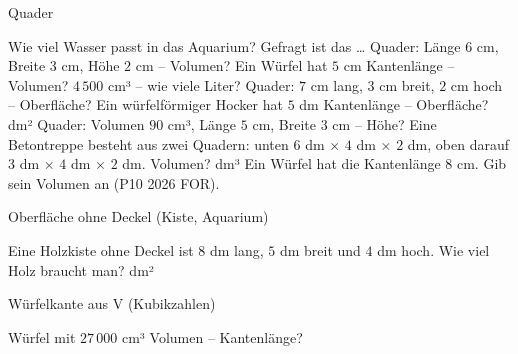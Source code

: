 \setcounter{aufgabe}{13}

\begin{aufgabe}{Quader}
\begin{teile}
\teil Wie viel Wasser passt in das Aquarium? Gefragt ist das …  
\teil Quader: Länge $6$ cm, Breite $3$ cm, Höhe $2$ cm – Volumen? \leerfeld[cm³]
\teil Ein Würfel hat $5$ cm Kantenlänge – Volumen? \leerfeld[cm³]
\teil $4\,500$ cm³ – wie viele Liter? \leerfeld[l]
\teil Quader: $7$ cm lang, $3$ cm breit, $2$ cm hoch – Oberfläche? \leerfeld[cm²]
\teil Ein würfelförmiger Hocker hat $5$ dm Kantenlänge – Oberfläche? \leerfeld dm²
\teil Quader: Volumen $90$ cm³, Länge $5$ cm, Breite $3$ cm – Höhe? \leerfeld[cm]
\teil Eine Betontreppe besteht aus zwei Quadern: unten $6$ dm × $4$ dm × $2$ dm, oben darauf $3$ dm × $4$ dm × $2$ dm. Volumen? \leerfeld dm³
\teil Ein Würfel hat die Kantenlänge $8$ cm. Gib sein Volumen an \hfill (P10 2026 FOR). \leerfeld[cm³]
\end{teile}
\end{aufgabe}

\begin{aufgabe}{Oberfläche ohne Deckel (Kiste, Aquarium)}
\begin{teile}
\teil Eine Holzkiste ohne Deckel ist $8$ dm lang, $5$ dm breit und $4$ dm hoch. Wie viel Holz braucht man? \leerfeld dm²
\end{teile}
\end{aufgabe}

\begin{aufgabe}{Würfelkante aus V (Kubikzahlen)}
\begin{teile}
\teil Würfel mit $27\,000$ cm³ Volumen – Kantenlänge? \leerfeld[cm]
\end{teile}
\end{aufgabe}

